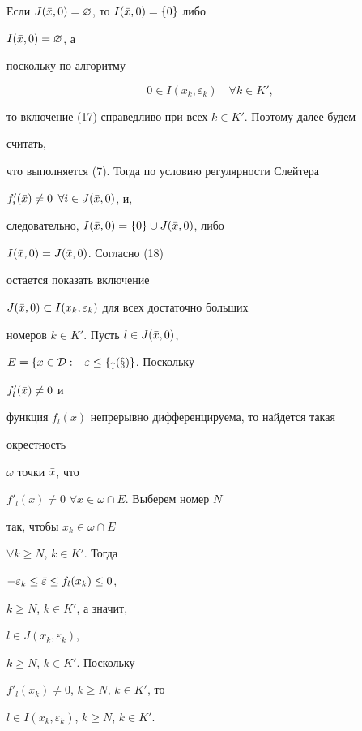 \begin{pf}


Если $J(\Bar x,0)=\varnothing$, то $I(\Bar x,0)=\{0\}$ либо


$I(\Bar x,0)=\varnothing$, а


поскольку по алгоритму


\begin{equation}


0\in I(x_k,\varepsilon_k)\quad \forall k\in K',


\end{equation}


то включение (17) справедливо при всех $k\in K'$. Поэтому далее будем


считать,


что выполняется (7). Тогда по условию регулярности Слейтера


$f'_i(\Bar x)\ne 0$ $\forall i\in J(\Bar x,0)$, и,


следовательно, $I(\Bar x,0)=\{0\}\cup J(\Bar x,0)$, либо


$I(\Bar x,0)=J(\Bar x,0)$. Согласно (18)


остается показать включение


$J(\Bar x,0)\subset I(x_k,\varepsilon_k)$ для всех достаточно больших


номеров $k\in K'$. Пусть $l\in J(\Bar x,0)$,


$E=\{x\in\cal D:-\Bar\varepsilon\le f_l(x)\}$. Поскольку


$f'_l(\Bar x)\ne 0$ и


функция $f_l(x)$ непрерывно дифференцируема, то найдется такая


окрестность


$\omega$ точки $\Bar x$, что


$f'_l(x)\ne 0$ $\forall x\in\omega\cap E$. Выберем номер $N$


так, чтобы $x_k\in\omega\cap E$


$\forall k\ge N$, $k\in K'$. Тогда


$-\varepsilon_k\le\Bar\varepsilon\le f_l(x_k)\le 0$,


$k\ge N$, $k\in K'$, а значит,


$l\in J(x_k,\varepsilon_k)$,


$k\ge N$, $k\in K'$. Поскольку


$f'_l(x_k)\ne 0$, $k\ge N$, $k\in K'$, то


$l\in I(x_k,\varepsilon_k)$, $k\ge N$, $k\in K'$.


\end{pf}





